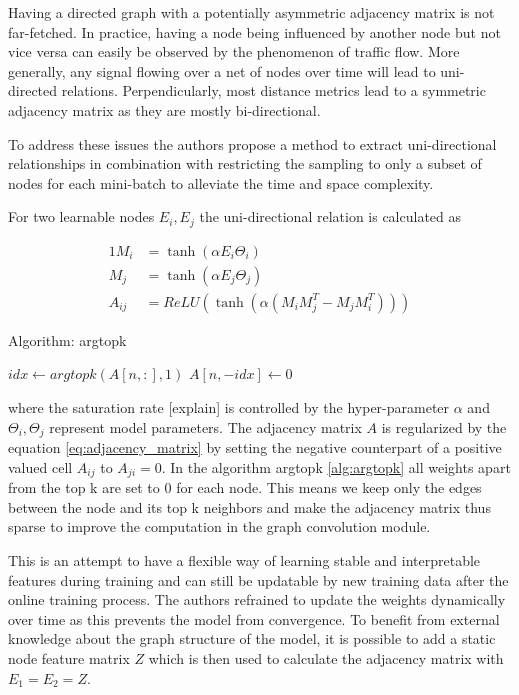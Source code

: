 \documentclass[letterpaper,twocolumn,12pt]{article}
\begin{document}
    Having a directed graph with a potentially asymmetric adjacency matrix is not far-fetched.
    In practice, having a node being influenced by another node but not vice versa can easily be observed by the phenomenon of traffic flow.
    More generally, any signal flowing over a net of nodes over time will lead to uni-directed relations.
    Perpendicularly, most distance metrics lead to a symmetric adjacency matrix as they are mostly bi-directional.

    To address these issues the authors propose a method to extract uni-directional relationships in combination with restricting the sampling
    to only a subset of nodes for each mini-batch to alleviate the time and space complexity.

    For two learnable nodes $E_i, E_j$ the uni-directional relation is calculated as

    \begin{alignat}{1}
        M_i &= \tanh (\alpha E_i \Theta_i) \\
        M_j &= \tanh (\alpha E_j \Theta_j)  \\
        A_{ij} &= ReLU(\tanh (\alpha(M_i M_j^T - M_j M_i^T))) \label{eq:adjacency_matrix}
    \end{alignat}
    \begin{algorithm}
        \caption{Algorithm: argtopk}\label{alg:argtopk}
        \begin{algorithmic}[1]
                \State $idx \gets argtopk(A[n,:], 1)$
                \State $A[n, -idx] \gets 0$
            \EndFor
        \end{algorithmic}
    \end{algorithm}
    where the saturation rate [explain] is controlled by the hyper-parameter $\alpha$ and  $\Theta_i, \Theta_j$ represent
    model parameters. The adjacency matrix $A$ is regularized by the equation \ref{eq:adjacency_matrix}
    by setting the negative counterpart of a positive valued cell $A_{ij}$ to $A_{ji} = 0$. In the algorithm argtopk \ref{alg:argtopk}
    all weights apart from the top k are set to 0 for each node.
    This means we keep only the edges between the node and its top k neighbors and make the adjacency matrix thus sparse to improve the computation in the graph convolution module.

    This is an attempt to have a flexible way of learning stable and interpretable features during training and can still be updatable by new training data after the online training process.
    The authors refrained to update the weights dynamically over time as this prevents the model from convergence.
    To benefit from external knowledge about the graph structure of the model, it is possible to add a static node feature matrix $Z$
    which is then used to calculate the adjacency matrix with $E_1 =  E_2 = Z $.
\end{document}
